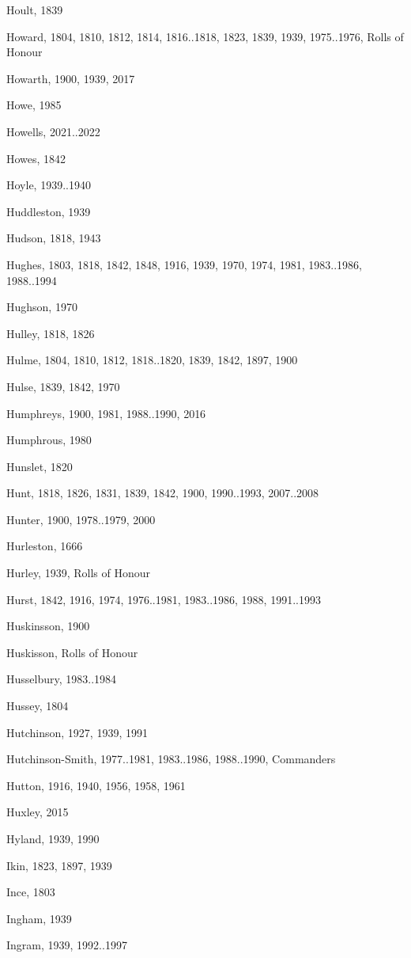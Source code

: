 \begin{theindex}
\item Hoult, 1839
\item Howard, 1804, 1810, 1812, 1814, 1816..1818, 1823, 1839, 1939, 1975..1976, Rolls of Honour
\item Howarth, 1900, 1939, 2017
\item Howe, 1985
\item Howells, 2021..2022
\item Howes, 1842
\item Hoyle, 1939..1940
\item Huddleston, 1939
\item Hudson, 1818, 1943
\item Hughes, 1803, 1818, 1842, 1848, 1916, 1939, 1970, 1974, 1981, 1983..1986, 1988..1994
\item Hughson, 1970
\item Hulley, 1818, 1826
\item Hulme, 1804, 1810, 1812, 1818..1820, 1839, 1842, 1897, 1900
\item Hulse, 1839, 1842, 1970
\item Humphreys, 1900, 1981, 1988..1990, 2016
\item Humphrous, 1980
\item Hunslet, 1820
\item Hunt, 1818, 1826, 1831, 1839, 1842, 1900, 1990..1993, 2007..2008
\item Hunter, 1900, 1978..1979, 2000
\item Hurleston, 1666
\item Hurley, 1939, Rolls of Honour
\item Hurst, 1842, 1916, 1974, 1976..1981, 1983..1986, 1988, 1991..1993
\item Huskinsson, 1900
\item Huskisson, Rolls of Honour
\item Husselbury, 1983..1984
\item Hussey, 1804
\item Hutchinson, 1927, 1939, 1991
\item Hutchinson-Smith, 1977..1981, 1983..1986, 1988..1990, Commanders
\item Hutton, 1916, 1940, 1956, 1958, 1961
\item Huxley, 2015
\item Hyland, 1939, 1990
\item Ikin, 1823, 1897, 1939
\item Ince, 1803
\item Ingham, 1939
\item Ingram, 1939, 1992..1997

\end{theindex}
